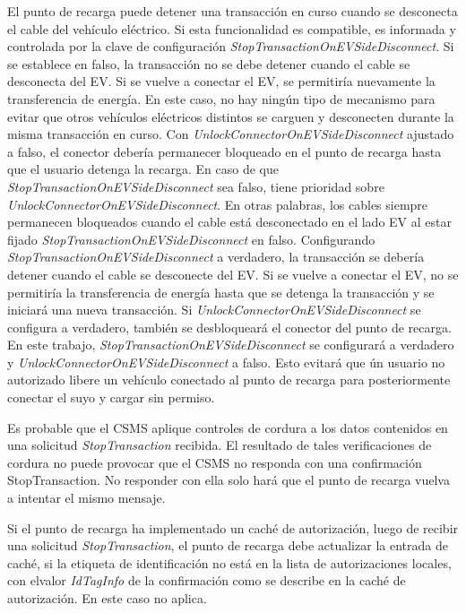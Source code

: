 \documentclass[12pt,a4paper,onecolumn,oneside]{report}
\begin{document}
El punto de recarga puede detener una transacción en curso cuando se desconecta el cable del vehículo eléctrico. Si esta funcionalidad es compatible, es informada y controlada por la clave de configuración \textit{StopTransactionOnEVSideDisconnect}. Si se establece en falso, la transacción no se debe detener cuando el cable se desconecta del EV. Si se vuelve a conectar el EV, se permitiría nuevamente la transferencia de energía. En este caso, no hay ningún tipo de mecanismo para evitar que otros vehículos eléctricos distintos se carguen y desconecten durante la misma transacción en curso. Con \textit{UnlockConnectorOnEVSideDisconnect} ajustado a falso, el conector debería permanecer bloqueado en el punto de recarga hasta que el usuario detenga la recarga. En caso de que \textit{StopTransactionOnEVSideDisconnect} sea falso, tiene prioridad sobre \textit{UnlockConnectorOnEVSideDisconnect}. En otras palabras, los cables siempre permanecen bloqueados cuando el cable está desconectado en el lado EV al estar fijado \textit{StopTransactionOnEVSideDisconnect} en falso. Configurando \textit{StopTransactionOnEVSideDisconnect} a verdadero, la transacción se debería detener cuando el cable se desconecte del EV. Si se vuelve a conectar el EV, no se permitiría la transferencia de energía hasta que se detenga la transacción y se iniciará una nueva transacción. Si \textit{UnlockConnectorOnEVSideDisconnect} se configura a verdadero, también se desbloqueará el conector del punto de recarga. En este trabajo, \textit{StopTransactionOnEVSideDisconnect} se configurará a verdadero y  \textit{UnlockConnectorOnEVSideDisconnect} a falso. Esto evitará que ún usuario no autorizado libere un vehículo conectado al punto de recarga para posteriormente conectar el suyo y cargar sin permiso.

Es probable que el CSMS aplique controles de cordura a los datos contenidos en una solicitud \textit{StopTransaction} recibida. El resultado de tales verificaciones de cordura no puede provocar que el CSMS no responda con una confirmación StopTransaction. No responder con ella solo hará que el punto de recarga vuelva a intentar el mismo mensaje.

Si el punto de recarga ha implementado un caché de autorización, luego de recibir una solicitud \textit{StopTransaction}, el punto de recarga debe actualizar la entrada de caché, si la etiqueta de identificación no está en la lista de autorizaciones locales, con elvalor \textit{IdTagInfo} de la confirmación como se describe en la caché de autorización. En este caso no aplica.
\end{document}
